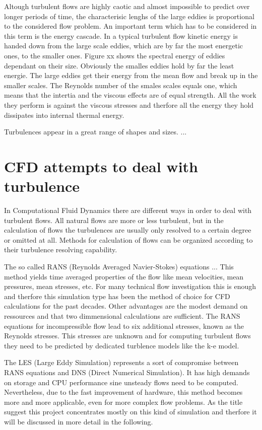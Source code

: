 Altough turbulent flows are highly caotic and almost impossible to predict over longer periods of time, the characterisic lenghs of the large eddies is proportional to the considered flow problem. An important term which has to be considered in this term is the energy cascade. In a typical turbulent flow kinetic energy is handed down from the large scale eddies, which are by far the most energetic ones, to the smaller ones. Figure xx shows the spectral energy of eddies dependant on their size. Obviously the smalles eddies hold by far the least energie. The large eddies get their energy from the mean flow and break up in the smaller scales. The Reynolds number of the smales scales equals one, which means that the intertia and the viscous effects are of equal strength. All the work they perform is against the viscous stresses and therfore all the energy they hold dissipates into internal thermal energy.
 
Turbulences appear in a great range of shapes and sizes. ... 

\section{CFD attempts to deal with turbulence}
In Computational Fluid Dynamics there are different ways in order to deal with turbulent flows. All natural flows are more or less turbulent, but in the calculation of flows the turbulences are usually only resolved to a certain degree or omitted at all. Methods for calculation of flows can be organized according to their turbulence resolving capability.

The so called RANS (Reynolds Averaged Navier-Stokes) equations ...
This method yields time averaged properties of the flow like mean velocities, mean pressures, mean stresses, etc. For many technical flow investigation this is enough and therfore this simulation type has been the method of choice for CFD calculations for the past decades. Other advantages are the modest demand on ressources and that two dimmensional calculations are sufficient.
The RANS equations for incompressible flow lead to six additional stresses, known as the Reynolds stresses. This stresses are unknown and for computing turbulent flows they need to be predicted by dedicated turblence models like the k-e model.

The LES (Large Eddy Simulation) represents a sort of compromise between RANS equations and DNS (Direct Numerical Simulation). It has high demands on storage and CPU performance sine unsteady flows need to be computed. Nevertheless, due to the fast improvement of hardware, this method becomes more and more applicable, even for more complex flow problems. As the title suggest this project concentrates mostly on this kind of simulation and therfore it will be discussed in more detail in the following.

